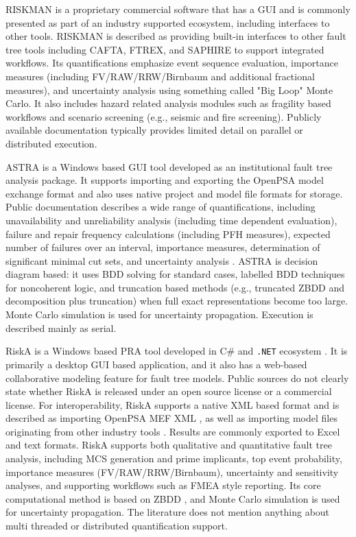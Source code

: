 RISKMAN \cite{riskman_2009} is a proprietary commercial software that has a GUI and is commonly presented as part of an industry supported ecosystem, including interfaces to other tools. RISKMAN is described as providing built-in interfaces to other fault tree tools including CAFTA, FTREX, and SAPHIRE to support integrated workflows. Its quantifications emphasize event sequence evaluation, importance measures (including FV/RAW/RRW/Birnbaum and additional fractional measures), and uncertainty analysis using something called "Big Loop" Monte Carlo. It also includes hazard related analysis modules such as fragility based workflows and scenario screening (e.g., seismic and fire screening). Publicly available documentation typically provides limited detail on parallel or distributed execution.

ASTRA \cite{astra_1999, astra_2008, astra_3, astra_3x} is a Windows based GUI tool developed as an institutional fault tree analysis package. It supports importing and exporting the OpenPSA model exchange format and also uses native project and model file formats for storage. Public documentation describes a wide range of quantifications, including unavailability and unreliability analysis (including time dependent evaluation), failure and repair frequency calculations (including PFH measures), expected number of failures over an interval, importance measures, determination of significant minimal cut sets, and uncertainty analysis \cite{astra_2010, astra_2012}. ASTRA is decision diagram based: it uses BDD solving for standard cases, labelled BDD techniques for noncoherent logic, and truncation based methods (e.g., truncated ZBDD and decomposition plus truncation) when full exact representations become too large. Monte Carlo simulation is used for uncertainty propagation. Execution is described mainly as serial.

RiskA is a Windows based PRA tool developed in C\# and \texttt{.NET} ecosystem \cite{riska_2015, riska_5}. It is primarily a desktop GUI based application, and it also has a web-based collaborative modeling feature for fault tree models. Public sources do not clearly state whether RiskA is released under an open source license or a commercial license. For interoperability, RiskA supports a native XML based format and is described as importing OpenPSA MEF XML \cite{riska_2013}, as well as importing model files originating from other industry tools \cite{riska_2016}. Results are commonly exported to Excel and text formats. RiskA supports both qualitative and quantitative fault tree analysis, including MCS generation and prime implicants, top event probability, importance measures (FV/RAW/RRW/Birnbaum), uncertainty and sensitivity analyses, and supporting workflows such as FMEA style reporting. Its core computational method is based on ZBDD \cite{riska_algorithm}, and Monte Carlo simulation is used for uncertainty propagation. The literature does not mention anything about multi threaded or distributed quantification support.

